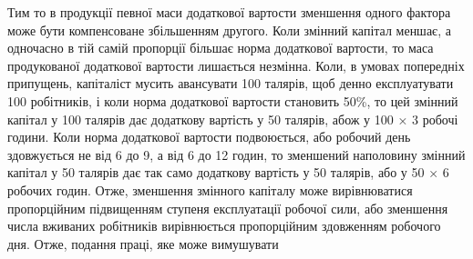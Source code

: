 Тим то в продукції певної маси додаткової вартости зменшення
одного фактора може бути компенсоване збільшенням другого.
Коли змінний капітал меншає, а одночасно в тій самій пропорції
більшає норма додаткової вартости, то маса продукованої додаткової
вартости лишається незмінна. Коли, в умовах попередніх
припущень, капіталіст мусить авансувати 100 талярів, щоб денно
експлуатувати 100 робітників, і коли норма додаткової вартости
становить 50\%, то цей змінний капітал у 100 талярів дає додаткову
вартість у 50 талярів, абож у 100 × 3 робочі години. Коли
норма додаткової вартости подвоюється, або робочий день здовжується
не від 6 до 9, а від 6 до 12 годин, то зменшений наполовину
змінний капітал у 50 талярів дає так само додаткову
вартість у 50 талярів, або у 50 × 6 робочих годин. Отже,
зменшення змінного капіталу може вирівнюватися пропорційним
підвищенням ступеня експлуатації робочої сили, або зменшення
числа вживаних робітників вирівнюється пропорційним здовженням
робочого дня. Отже, подання праці, яке може вимушувати
\parbreak{}  %
